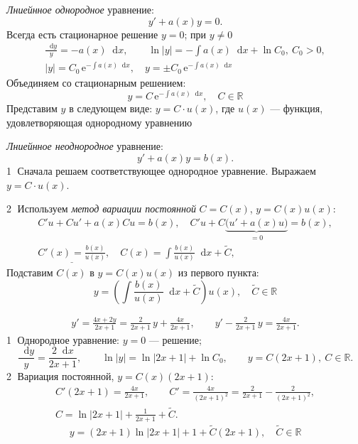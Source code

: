 \documentclass[12pt,a4paper]{article}
\numberwithin{equation}{section}
\newcommand{\R}{\mathbb{R}}
\newcommand{\e}{\mathrm{e}}
\newcommand{\dd}{\mathop{}\!\mathrm{d}}
\begin{document}
\label{box:type6}
\begin{definitionHSE}
\textit{Лниейнное однородное} уравнение:
\[y'+a(x)y=0.\]
Всегда есть стационарное решение $y=0$; при $y\neq0$
\begin{gather*}
\frac{\dd y}{y}=-a(x)\dd x,\qquad \ln|y|=-\int a(x)\dd x+\ln C_0,\ C_0>0,\\
|y|=C_0\,\e^{-\int a(x)\dd x},\quad y=\pm C_0\,\e^{-\int a(x)\dd x}
\end{gather*}
Объединяем со стационарным решением:
\[\boxed{\ y=C\,\e^{-\int a(x)\dd x},\quad C\in\R\ }\]
Представим \(y\) в следующем виде: \(y=C\cdot u(x)\), где \(u(x)\) --- функция, удовлетворяющая однородному уравнению

\textit{Лниейнное неоднородное} уравнение:
\[y'+a(x)y=b(x).\]
\textcircled{1} Сначала решаем соответствующее однородное уравнение. Выражаем \(y=C\cdot u(x)\).

\textcircled{2} Используем \textit{метод вариации постоянной} $C=C(x)$, $y=C(x)u(x)$:
\begin{gather*}
C'u+Cu'+a(x)Cu=b(x),\quad C'u+C\underbrace{\bigl(u'+a(x)u\bigr)}_{=0}=b(x),\\
\underline{C'(x)=\frac{b(x)}{u(x)}},\quad C(x)=\int\frac{b(x)}{u(x)}\dd x+\widetilde C,
\end{gather*}
Подставим \(C(x)\) в \(y=C(x)u(x)\) из первого пункта:
\[
\boxed{\ y=\left(\int\frac{b(x)}{u(x)}\dd x+\widetilde C\right)u(x),\quad\widetilde C\in\R\ }
\]
\end{definitionHSE}

\begin{exampleHSE}[\((2x+1)y'=4x+2y\)]
\begin{gather*}
y'=\frac{4x+2y}{2x+1}=\frac{2}{2x+1}\,y+\frac{4x}{2x+1},\qquad
y'-\frac{2}{2x+1}\,y=\frac{4x}{2x+1}.
\end{gather*}
\textcircled{1} Однородное уравнение: $y=0$ --- решение;
\[
\frac{\dd y}{y}=\frac{2\dd x}{2x+1},\qquad \ln|y|=\ln|2x+1|+\ln C_0,\qquad y=C(2x+1),\ C\in\R.
\]
\textcircled{2} Вариация постоянной, $y=C(x)(2x+1)$:
\begin{gather*}
C'(2x+1)=\frac{4x}{2x+1},\qquad C'=\frac{4x}{(2x+1)^2}=\frac{2}{2x+1}-\frac{2}{(2x+1)^2},\\
C=\ln|2x+1|+\frac{1}{2x+1}+\widetilde C.
\end{gather*}
\[
\boxed{\ y=(2x+1)\ln|2x+1|+1+\widetilde C(2x+1),\quad \widetilde C\in\R\ }
\]
\end{exampleHSE}
\end{document}
